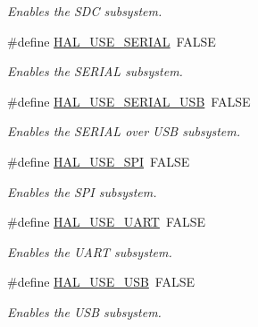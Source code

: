 \begin{DoxyCompactItemize}
\begin{DoxyCompactList}\small\item\em Enables the S\+DC subsystem. \end{DoxyCompactList}\item 
\hypertarget{group__HAL__CONF_ga720d92b9c3a00d952f6f0c8665b54ebb}{}\label{group__HAL__CONF_ga720d92b9c3a00d952f6f0c8665b54ebb} 
\#define \hyperlink{group__HAL__CONF_ga720d92b9c3a00d952f6f0c8665b54ebb}{H\+A\+L\+\_\+\+U\+S\+E\+\_\+\+S\+E\+R\+I\+AL}~F\+A\+L\+SE
\begin{DoxyCompactList}\small\item\em Enables the S\+E\+R\+I\+AL subsystem. \end{DoxyCompactList}\item 
\hypertarget{group__HAL__CONF_ga79c970fb20565143ad8b65720c0b2d0e}{}\label{group__HAL__CONF_ga79c970fb20565143ad8b65720c0b2d0e} 
\#define \hyperlink{group__HAL__CONF_ga79c970fb20565143ad8b65720c0b2d0e}{H\+A\+L\+\_\+\+U\+S\+E\+\_\+\+S\+E\+R\+I\+A\+L\+\_\+\+U\+SB}~F\+A\+L\+SE
\begin{DoxyCompactList}\small\item\em Enables the S\+E\+R\+I\+AL over U\+SB subsystem. \end{DoxyCompactList}\item 
\hypertarget{group__HAL__CONF_ga33a3c5bee9ed1f665aace8b88fed9b2b}{}\label{group__HAL__CONF_ga33a3c5bee9ed1f665aace8b88fed9b2b} 
\#define \hyperlink{group__HAL__CONF_ga33a3c5bee9ed1f665aace8b88fed9b2b}{H\+A\+L\+\_\+\+U\+S\+E\+\_\+\+S\+PI}~F\+A\+L\+SE
\begin{DoxyCompactList}\small\item\em Enables the S\+PI subsystem. \end{DoxyCompactList}\item 
\hypertarget{group__HAL__CONF_ga73220cad2edf2aee77b7ce1b53cacff0}{}\label{group__HAL__CONF_ga73220cad2edf2aee77b7ce1b53cacff0} 
\#define \hyperlink{group__HAL__CONF_ga73220cad2edf2aee77b7ce1b53cacff0}{H\+A\+L\+\_\+\+U\+S\+E\+\_\+\+U\+A\+RT}~F\+A\+L\+SE
\begin{DoxyCompactList}\small\item\em Enables the U\+A\+RT subsystem. \end{DoxyCompactList}\item 
\hypertarget{group__HAL__CONF_gafc8f8fc6010f46f5baae4a369e14974e}{}\label{group__HAL__CONF_gafc8f8fc6010f46f5baae4a369e14974e} 
\#define \hyperlink{group__HAL__CONF_gafc8f8fc6010f46f5baae4a369e14974e}{H\+A\+L\+\_\+\+U\+S\+E\+\_\+\+U\+SB}~F\+A\+L\+SE
\begin{DoxyCompactList}\small\item\em Enables the U\+SB subsystem. \end{DoxyCompactList}\item 

\end{DoxyCompactItemize}

